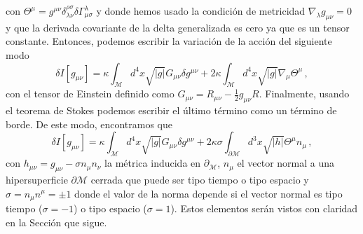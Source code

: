 \documentclass[../Main.tex]{subfiles}
\begin{document}
con $\Theta^{\mu}=g^{\mu\nu}\delta^{\rho\sigma}_{\lambda\nu}\delta\Gamma^{\lambda}_{\mu\sigma}$ y donde hemos usado la condición de metricidad $\nabla_{\lambda}g_{\mu\nu}=0$ y que la derivada covariante de la delta generalizada es cero ya que es un tensor constante. Entonces, podemos escribir la variación de la  acción del siguiente modo
\begin{equation}
    \delta I[g_{\mu\nu}]=\kappa \int_{\mathcal{M}} d^{4}x \sqrt{\lvert g \rvert}G_{\mu\nu}\delta g^{\mu\nu}+2\kappa \int_{\mathcal{M}} d^{4}x \sqrt{\lvert g \rvert}\nabla_{\mu}\Theta^{\mu}\,, \label{varinicial}
\end{equation}
con el tensor de Einstein definido como  $G_{\mu\nu}=R_{\mu\nu}-\frac{1}{2}g_{\mu\nu}R$. Finalmente, usando el teorema de Stokes podemos escribir el último término como un término de borde. De este modo, encontramos que
\begin{equation}
    \delta I[g_{\mu\nu}]=\kappa \int_{\mathcal{M}} d^{4}x \sqrt{\lvert g \rvert}G_{\mu\nu}\delta g^{\mu\nu}+2\kappa\sigma \int_{\partial\mathcal{M}} d^{3}x \sqrt{\lvert h \rvert}\Theta^{\mu}n_{\mu}\, , \label{var3}
\end{equation} 
con $h_{\mu\nu}=g_{\mu\nu}-\sigma n_{\mu}n_{\nu}$ la métrica inducida en $\partial_\mathcal{M}$, $n_{\mu}$ el vector normal a una hipersuperficie $\partial\mathcal{M}$ cerrada que puede ser tipo tiempo o tipo espacio y $\sigma=n_{\mu}n^{\mu}=\pm 1$ donde el valor de la norma depende si el vector normal es tipo tiempo ($\sigma=-1$) o tipo espacio ($\sigma=1$). Estos elementos serán vistos con claridad en la Sección que sigue. 
\end{document}
